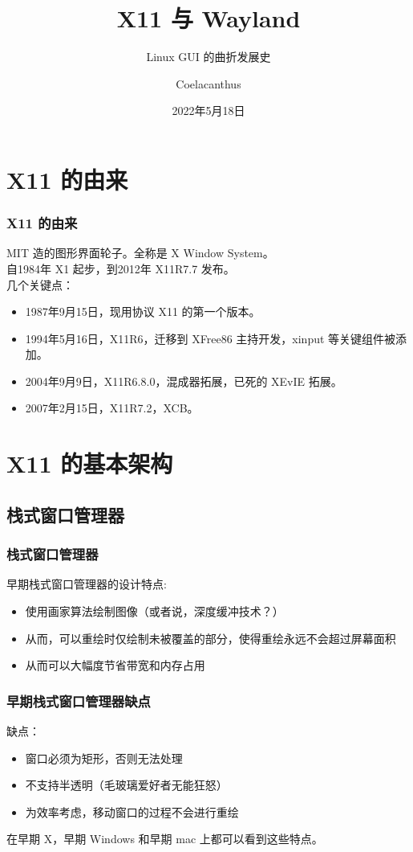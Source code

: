 \documentclass[UTF-8]{ctexbeamer}
\title{X11 与 Wayland}
\subtitle{Linux GUI 的曲折发展史}
\author{Coelacanthus}
\institute{PLCT Arch RISC-V 小队}
\date{2022年5月18日}
\begin{document}
\frame{\titlepage}

\section{X11 的由来}
\begin{frame}
	\frametitle{X11 的由来}
	MIT 造的图形界面轮子。全称是 X Window System。\\
	自1984年 X1 起步，到2012年 X11R7.7 发布。\\
	几个关键点：
	\begin{itemize}
		\item 1987年9月15日，现用协议 X11 的第一个版本。
		\item 1994年5月16日，X11R6，迁移到 XFree86 主持开发，xinput 等关键组件被添加。
		\item 2004年9月9日，X11R6.8.0，混成器拓展，已死的 XEvIE 拓展。
		\item 2007年2月15日，X11R7.2，XCB。
	\end{itemize}

\end{frame}

\section{X11 的基本架构}
\subsection{栈式窗口管理器}
\begin{frame}[fragile]
	\frametitle{栈式窗口管理器}
	早期栈式窗口管理器的设计特点:
	\begin{itemize}
		\item 使用画家算法绘制图像（或者说，深度缓冲技术？）
		\item 从而，可以重绘时仅绘制未被覆盖的部分，使得重绘永远不会超过屏幕面积
		\item 从而可以大幅度节省带宽和内存占用
	\end{itemize}
	
\end{frame}
\begin{frame}[fragile]
	\frametitle{早期栈式窗口管理器缺点}
	缺点：
	\begin{itemize}
		\item 窗口必须为矩形，否则无法处理
		\item 不支持半透明（毛玻璃爱好者无能狂怒）
		\item 为效率考虑，移动窗口的过程不会进行重绘
	\end{itemize}
	
	在早期 X，早期 Windows 和早期 mac 上都可以看到这些特点。
	
\end{frame}
\end{document}
